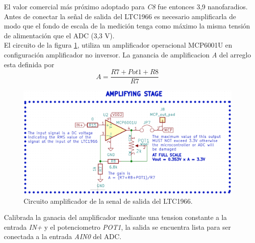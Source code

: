 El valor comercial más próximo adoptado para \textit{C8} fue entonces 3,9 nanofaradios.\\
Antes de conectar la señal de salida del LTC1966 es necesario amplificarla de modo que el fondo de escala de la medición tenga como máximo la misma tensión de alimentación que el ADC (3,3 V).\\
El circuito de la figura \ref{fig:ctoopamp}, utiliza un amplificador operacional MCP6001U \citep{mcp6001} en configuración amplificador no inversor. La ganancia de amplificacion \textit{A} del arreglo esta definida por
\begin{equation}
	A=\frac{R7+Pot1+R8}{R7}
\end{equation}

\begin{figure}[h!]
	\centering
	\includegraphics[width=0.7\linewidth]{Figures/cto_op_amp}
	\caption{Circuito amplificador de la senal de salida del LTC1966.}
	\label{fig:ctoopamp}
\end{figure}
Calibrada la ganacia del amplificador mediante una tension constante a la entrada \textit{IN+} y el potenciometro \textit{POT1}, la salida se encuentra lista para ser conectada a la entrada \textit{AIN0} del ADC.\\

